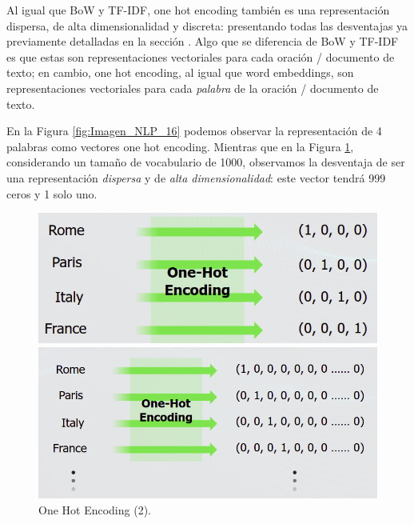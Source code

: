 \documentclass[12pt,a4paper]{article}
\begin{document}
\begin{sloppypar}
Al igual que BoW y TF-IDF, one hot encoding también es una representación dispersa, de alta dimensionalidad y discreta: presentando todas las desventajas ya previamente detalladas en la sección \textit{}. Algo que se diferencia de BoW y TF-IDF es que estas son representaciones vectoriales para cada oración / documento de texto; en cambio, one hot encoding, al igual que word embeddings, son representaciones vectoriales para cada \textit{palabra} de la oración / documento de texto. 

En la Figura \ref{fig:Imagen_NLP_16} podemos observar la representación de 4 palabras como vectores one hot encoding. Mientras que en la Figura \ref{fig:Imagen_NLP_17}, considerando un tamaño de vocabulario de 1000, observamos la desventaja de ser una representación \textit{dispersa} y de \textit{alta dimensionalidad}: este vector tendrá 999 ceros y 1 solo uno.

\begin{figure}[H] %
\begin{minipage}[b]{0.5\linewidth}
\centering
\includegraphics[width=\linewidth]{images/NLP/16.png}
\caption{One Hot Encoding (1)\cite{NLP_28}.}
\label{fig:Imagen_NLP_16}
\end{minipage}
\hspace{0.5cm}
\begin{minipage}[b]{0.5\linewidth}
\centering
\includegraphics[width=\linewidth]{images/NLP/17.png}
\caption{One Hot Encoding (2)\cite{NLP_28}.}
\label{fig:Imagen_NLP_17}
\end{minipage}
\end{figure}


\end{sloppypar}
\end{document}

